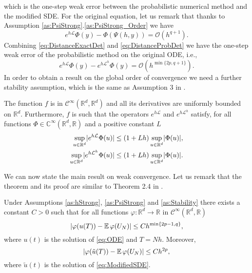 \documentclass{siamart1116}
\numberwithin{theorem}{section}
\DeclarePairedDelimiter{\abs}{\lvert}{\rvert}
\renewcommand{\phi}{\varphi}
\newcommand{\R}{\mathbb{R}}
\newcommand{\C}{\mathbb{C}}
\newcommand{\OO}{\mathcal{O}}
\newcommand{\diffL}{\mathcal{L}}
\newcommand{\E}{\operatorname{\mathbb{E}}}
\begin{document}
which is the one-step weak error between the probabilistic numerical method and the modified SDE. For the original equation, let us remark that thanks to Assumption \ref{as:PsiStrong}.\ref{as:PsiStrong_Order} we have
\begin{equation}\label{eq:DistanceExactDet}
	e^{h\diffL}\Phi(y) - \Phi(\Psi(h, y)) = \OO(h^{q+1}).
\end{equation}
Combining \eqref{eq:DistanceExactDet} and \eqref{eq:DistanceProbDet} we have the one-step weak error of the probabilistic method on the original ODE, i.e., 
\begin{equation}\label{eq:LocalWeakError}
	e^{h\diffL}\Phi(y) - e^{h\diffL^h}\Phi(y) = \OO(h^{\min\{2p, q+1\}}).
\end{equation}
In order to obtain a result on the global order of convergence we need a further stability assumption, which is the same as Assumption 3 in \cite{CGS16}.

\begin{assumption}\label{as:Stability} The function $f$ is in $\mathcal{C}^\infty(\R^d, \R^d)$ and all its derivatives are uniformly bounded on $\R^d$. Furthermore, $f$ is such that the operators $e^{h\diffL}$ and $e^{h\diffL^h}$ satisfy, for all functions $\Phi\in\C^{\infty}(\R^d, \R)$ and a positive constant $L$
	\begin{equation}
	\begin{aligned}
		\sup_{u\in\R^d} \abs{e^{h\diffL}\Phi(u)} &\leq (1 + Lh)\sup_{u\in\R^d}\abs{\Phi(u)},\\
		\sup_{u\in\R^d} \abs{e^{h\diffL^h}\Phi(u)} &\leq (1 + Lh)\sup_{u\in\R^d}\abs{\Phi(u)}.
	\end{aligned}
	\end{equation}
\end{assumption}

We can now state the main result on weak convergence. Let us remark that the theorem and its proof are similar to Theorem 2.4 in \cite{CGS16}.

\begin{theorem}\label{thm:weakOrder} Under Assumptions \ref{as:hStrong}, \ref{as:PsiStrong} and \ref{as:Stability} there exists a constant $C > 0$ such that for all functions $\phi\colon\R^d\to\R$ in $\mathcal{C}^\infty(\R^d,\R)$
	\begin{equation}
		\abs{\phi(u(T)) - \E\phi(U_N)} \leq Ch^{\min\{2p - 1, q\}},
	\end{equation}
	where $u(t)$ is the solution of \eqref{eq:ODE} and $T = Nh$. Moreover, 
	\begin{equation}
		\abs{\phi(\tilde u(T)) - \E\phi(U_N)} \leq Ch^{2p},		
	\end{equation}
	where $\tilde u(t)$ is the solution of \eqref{eq:ModifiedSDE}.
\end{theorem}
\end{document}
